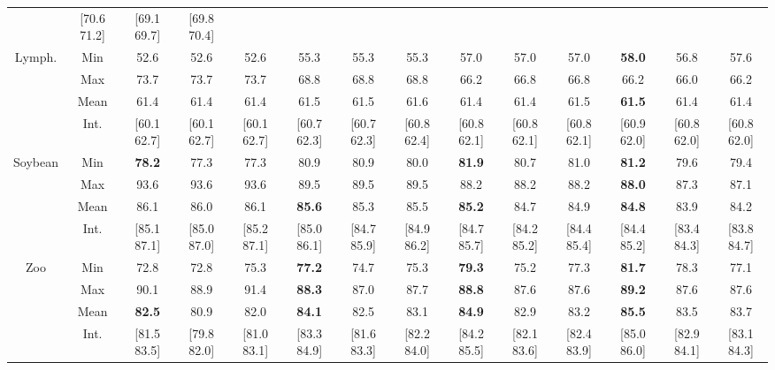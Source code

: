 \documentclass[10pt]{article}
\begin{document}
\begin{Table}
{\begin{tabular}{|c|c|ccc|ccc|ccc|ccc|}
 &[70.6 71.2] &[69.1 69.7] &[69.8 70.4]  %
\\
\cline{1-14}
\multirow{4}{1.6cm}{Lymph.}
&Min
 &52.6 &52.6 &52.6  %
 &55.3 &55.3 &55.3  %
 &57.0 &57.0 &57.0  %
 &{\bfseries 58.0} &56.8 &57.6  %
\\
&Max
 &73.7 &73.7 &73.7  %
 &68.8 &68.8 &68.8  %
 &66.2 &66.8 &66.8  %
 &66.2 &66.0 &66.2  %
\\
&Mean
 &61.4 &61.4 &61.4  %
 &61.5 &61.5 &61.6  %
 &61.4 &61.4 &61.5  %
 &{\bfseries 61.5} &61.4 &61.4  %
\\
&Int.
 &[60.1 62.7] &[60.1 62.7] &[60.1 62.7]  %
 &[60.7 62.3] &[60.7 62.3] &[60.8 62.4]  %
 &[60.8 62.1] &[60.8 62.1] &[60.8 62.1]  %
 &[60.9 62.0] &[60.8 62.0] &[60.8 62.0]  %
\\
\cline{1-14}
\multirow{4}{1.6cm}{Soybean}
&Min
 &{\bfseries 78.2} &77.3 &77.3  %
 &80.9 &80.9 &80.0  %
 &{\bfseries 81.9} &80.7 &81.0  %
 &{\bfseries 81.2} &79.6 &79.4  %
\\
&Max
 &93.6 &93.6 &93.6  %
 &89.5 &89.5 &89.5  %
 &88.2 &88.2 &88.2  %
 &{\bfseries 88.0} &87.3 &87.1  %
\\
&Mean
 &86.1 &86.0 &86.1  %
 &{\bfseries 85.6} &85.3 &85.5  %
 &{\bfseries 85.2} &84.7 &84.9  %
 &{\bfseries 84.8} &83.9 &84.2  %
\\
&Int.
 &[85.1 87.1] &[85.0 87.0] &[85.2 87.1]  %
 &[85.0 86.1] &[84.7 85.9] &[84.9 86.2]  %
 &[84.7 85.7] &[84.2 85.2] &[84.4 85.4]  %
 &[84.4 85.2] &[83.4 84.3] &[83.8 84.7]  %
\\
\cline{1-14}
\multirow{4}{1.6cm}{Zoo}
&Min
 &72.8 &72.8 &75.3  %
 &{\bfseries 77.2} &74.7 &75.3  %
 &{\bfseries 79.3} &75.2 &77.3  %
 &{\bfseries 81.7} &78.3 &77.1  %
\\
&Max
 &90.1 &88.9 &91.4  %
 &{\bfseries 88.3} &87.0 &87.7  %
 &{\bfseries 88.8} &87.6 &87.6  %
 &{\bfseries 89.2} &87.6 &87.6  %
\\
&Mean
 &{\bfseries 82.5} &80.9 &82.0  %
 &{\bfseries 84.1} &82.5 &83.1  %
 &{\bfseries 84.9} &82.9 &83.2  %
 &{\bfseries 85.5} &83.5 &83.7  %
\\
&Int.
 &[81.5 83.5] &[79.8 82.0] &[81.0 83.1]  %
 &[83.3 84.9] &[81.6 83.3] &[82.2 84.0]  %
 &[84.2 85.5] &[82.1 83.6] &[82.4 83.9]  %
 &[85.0 86.0] &[82.9 84.1] &[83.1 84.3]  %
\\
\cline{1-14}
\hline
\end{tabular}
}
\end{Table}
\end{document}
